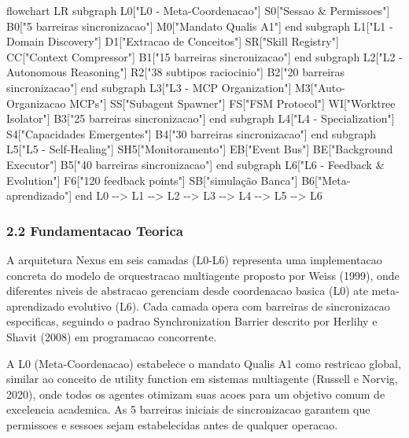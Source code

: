 \documentclass[
  12pt,
]{article}
\newenvironment{Shaded}{}{}
\newcommand{\NormalTok}[1]{#1}
\begin{document}
\begin{Shaded}
\begin{Highlighting}[]
\NormalTok{flowchart LR}
\NormalTok{subgraph L0["L0 {-} Meta{-}Coordenacao"]}
\NormalTok{S0["Sessao \& Permissoes"]}
\NormalTok{B0["5 barreiras sincronizacao"]}
\NormalTok{M0["Mandato Qualis A1"]}
\NormalTok{end}
\NormalTok{subgraph L1["L1 {-} Domain Discovery"]}
\NormalTok{D1["Extracao de Conceitos"]}
\NormalTok{SR["Skill Registry"]}
\NormalTok{CC["Context Compressor"]}
\NormalTok{B1["15 barreiras sincronizacao"]}
\NormalTok{end}
\NormalTok{subgraph L2["L2 {-} Autonomous Reasoning"]}
\NormalTok{R2["38 subtipos raciocinio"]}
\NormalTok{B2["20 barreiras sincronizacao"]}
\NormalTok{end}
\NormalTok{subgraph L3["L3 {-} MCP Organization"]}
\NormalTok{M3["Auto{-}Organizacao MCPs"]}
\NormalTok{SS["Subagent Spawner"]}
\NormalTok{FS["FSM Protocol"]}
\NormalTok{WI["Worktree Isolator"]}
\NormalTok{B3["25 barreiras sincronizacao"]}
\NormalTok{end}
\NormalTok{subgraph L4["L4 {-} Specialization"]}
\NormalTok{S4["Capacidades Emergentes"]}
\NormalTok{B4["30 barreiras sincronizacao"]}
\NormalTok{end}
\NormalTok{subgraph L5["L5 {-} Self{-}Healing"]}
\NormalTok{SH5["Monitoramento"]}
\NormalTok{EB["Event Bus"]}
\NormalTok{BE["Background Executor"]}
\NormalTok{B5["40 barreiras sincronizacao"]}
\NormalTok{end}
\NormalTok{subgraph L6["L6 {-} Feedback \& Evolution"]}
\NormalTok{F6["120 feedback points"]}
\NormalTok{SB["simulação Banca"]}
\NormalTok{B6["Meta{-}aprendizado"]}
\NormalTok{end}
\NormalTok{L0 {-}{-}\textgreater{} L1 {-}{-}\textgreater{} L2 {-}{-}\textgreater{} L3 {-}{-}\textgreater{} L4 {-}{-}\textgreater{} L5 {-}{-}\textgreater{} L6}
\end{Highlighting}
\end{Shaded}

\subsubsection{2.2 Fundamentacao Teorica}\label{fundamentacao-teorica-1}

A arquitetura Nexus em seis camadas (L0-L6) representa uma implementacao
concreta do modelo de orquestracao multiagente proposto por Weiss
(1999), onde diferentes niveis de abstracao gerenciam desde coordenacao
basica (L0) ate meta-aprendizado evolutivo (L6). Cada camada opera com
barreiras de sincronizacao especificas, seguindo o padrao
Synchronization Barrier descrito por Herlihy e Shavit (2008) em
programacao concorrente.

A L0 (Meta-Coordenacao) estabelece o mandato Qualis A1 como restricao
global, similar ao conceito de utility function em sistemas multiagente
(Russell e Norvig, 2020), onde todos os agentes otimizam suas acoes para
um objetivo comum de excelencia academica. As 5 barreiras iniciais de
sincronizacao garantem que permissoes e sessoes sejam estabelecidas
antes de qualquer operacao.
\end{document}

